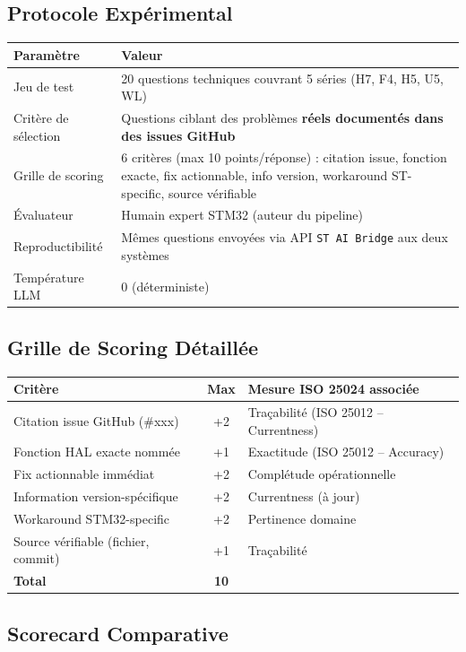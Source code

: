 \documentclass[12pt,a4paper]{report}
\begin{document}
\subsection{Protocole Expérimental}

\begin{longtable}{p{4cm}p{9cm}}
\toprule
\textbf{Paramètre} & \textbf{Valeur} \\
\midrule
Jeu de test & 20 questions techniques couvrant 5 séries (H7, F4, H5, U5, WL) \\
Critère de sélection & Questions ciblant des problèmes \textbf{réels documentés dans des issues GitHub} \\
Grille de scoring & 6 critères (max 10 points/réponse) : citation issue, fonction exacte, fix actionnable, info version, workaround ST-specific, source vérifiable \\
Évaluateur & Humain expert STM32 (auteur du pipeline) \\
Reproductibilité & Mêmes questions envoyées via API \texttt{ST AI Bridge} aux deux systèmes \\
Température LLM & 0 (déterministe) \\
\bottomrule
\end{longtable}

\subsection{Grille de Scoring Détaillée}

\begin{longtable}{p{4.5cm}cp{7cm}}
\toprule
\textbf{Critère} & \textbf{Max} & \textbf{Mesure ISO 25024 associée} \\
\midrule
Citation issue GitHub (\#xxx) & +2 & Traçabilité (ISO 25012 -- Currentness) \\
Fonction HAL exacte nommée & +1 & Exactitude (ISO 25012 -- Accuracy) \\
Fix actionnable immédiat & +2 & Complétude opérationnelle \\
Information version-spécifique & +2 & Currentness (à jour) \\
Workaround STM32-specific & +2 & Pertinence domaine \\
Source vérifiable (fichier, commit) & +1 & Traçabilité \\
\midrule
\textbf{Total} & \textbf{10} & \\
\bottomrule
\end{longtable}

\subsection{Scorecard Comparative}
\end{document}
